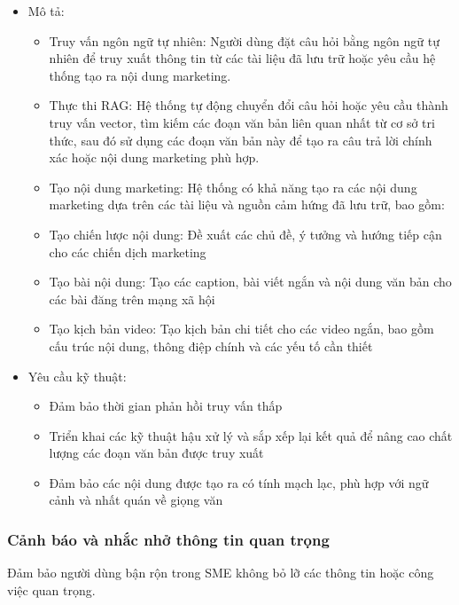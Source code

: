 \begin{itemize}
\item
  Mô tả:

  \begin{itemize}
  \item
    Truy vấn ngôn ngữ tự nhiên: Người dùng đặt câu hỏi bằng ngôn ngữ tự
    nhiên để truy xuất thông tin từ các tài liệu đã lưu trữ hoặc yêu cầu
    hệ thống tạo ra nội dung marketing.
  \item
    Thực thi RAG: Hệ thống tự động chuyển đổi câu hỏi hoặc yêu cầu thành
    truy vấn vector, tìm kiếm các đoạn văn bản liên quan nhất từ cơ sở
    tri thức, sau đó sử dụng các đoạn văn bản này để tạo ra câu trả lời
    chính xác hoặc nội dung marketing phù hợp.
  \item
    Tạo nội dung marketing: Hệ thống có khả năng tạo ra các nội dung
    marketing dựa trên các tài liệu và nguồn cảm hứng đã lưu trữ, bao
    gồm:
  \item
    Tạo chiến lược nội dung: Đề xuất các chủ đề, ý tưởng và hướng tiếp
    cận cho các chiến dịch marketing
  \item
    Tạo bài nội dung: Tạo các caption, bài viết ngắn và nội dung văn bản
    cho các bài đăng trên mạng xã hội
  \item
    Tạo kịch bản video: Tạo kịch bản chi tiết cho các video ngắn, bao
    gồm cấu trúc nội dung, thông điệp chính và các yếu tố cần thiết
  \end{itemize}
\item
  Yêu cầu kỹ thuật:

  \begin{itemize}
  \item
    Đảm bảo thời gian phản hồi truy vấn thấp
  \item
    Triển khai các kỹ thuật hậu xử lý và sắp xếp lại kết quả để nâng cao
    chất lượng các đoạn văn bản được truy xuất
  \item
    Đảm bảo các nội dung được tạo ra có tính mạch lạc, phù hợp với ngữ
    cảnh và nhất quán về giọng văn
  \end{itemize}
\end{itemize}

\subsubsection{Cảnh báo và nhắc nhở thông tin quan
trọng}\label{cux1ea3nh-buxe1o-vuxe0-nhux1eafc-nhux1edf-thuxf4ng-tin-quan-trux1ecdng}

Đảm bảo người dùng bận rộn trong SME không bỏ lỡ các thông tin hoặc công
việc quan trọng.

